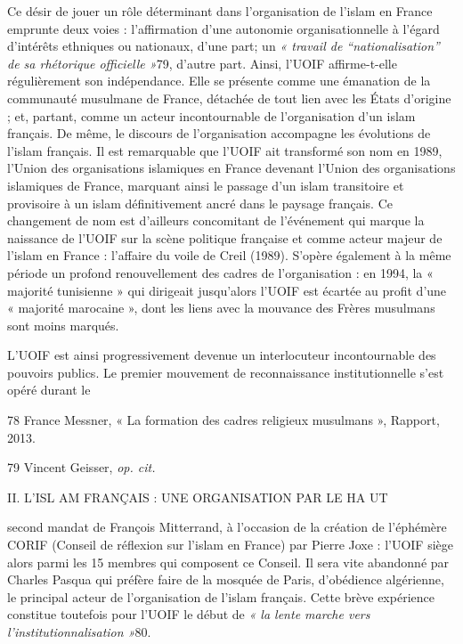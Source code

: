 Ce désir de jouer un rôle déterminant dans l'organisation de l'islam en
France emprunte deux voies : l'affirmation d'une autonomie
organisationnelle à l'égard d'intérêts ethniques ou nationaux, d'une
part; un \emph{« travail de ``nationalisation'' de sa rhétorique
officielle »}79, d'autre part. Ainsi, l'UOIF affirme-t-elle
régulièrement son indépendance. Elle se présente comme une émanation de
la communauté musulmane de France, détachée de tout lien avec les États
d'origine ; et, partant, comme un acteur incontournable de
l'organisation d'un islam français. De même, le discours de
l'organisation accompagne les évolutions de l'islam français. Il est
remarquable que l'UOIF ait transformé son nom en 1989, l'Union des
organisations islamiques en France devenant l'Union des organisations
islamiques de France, marquant ainsi le passage d'un islam transitoire
et provisoire à un islam définitivement ancré dans le paysage français.
Ce changement de nom est d'ailleurs concomitant de l'événement qui
marque la naissance de l'UOIF sur la scène politique française et comme
acteur majeur de l'islam en France : l'affaire du voile de Creil (1989).
S'opère également à la même période un profond renouvellement des cadres
de l'organisation : en 1994, la « majorité tunisienne » qui dirigeait
jusqu'alors l'UOIF est écartée au profit d'une « majorité marocaine »,
dont les liens avec la mouvance des Frères musulmans sont moins marqués.

L'UOIF est ainsi progressivement devenue un interlocuteur incontournable
des pouvoirs publics. Le premier mouvement de reconnaissance
institutionnelle s'est opéré durant le

78 France Messner, « La formation des cadres religieux musulmans »,
Rapport, 2013.

79 Vincent Geisser, \emph{op. cit.}

II. L'ISL AM FRANÇAIS : UNE ORGANISATION PAR LE HA UT

second mandat de François Mitterrand, à l'occasion de la création de
l'éphémère CORIF (Conseil de réflexion sur l'islam en France) par Pierre
Joxe : l'UOIF siège alors parmi les 15 membres qui composent ce Conseil.
Il sera vite abandonné par Charles Pasqua qui préfère faire de la
mosquée de Paris, d'obédience algérienne, le principal acteur de
l'organisation de l'islam français. Cette brève expérience constitue
toutefois pour l'UOIF le début de \emph{« la lente marche vers
l'institutionnalisation »}80.

